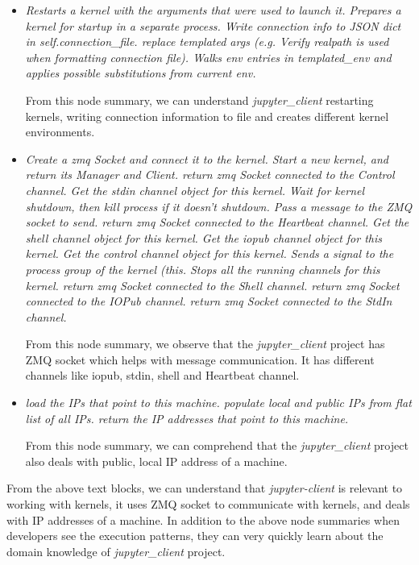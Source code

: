 \begin{itemize}
    \item \emph{ Restarts a kernel with the arguments that were used to launch it. Prepares a kernel for startup in a separate process. Write connection info to JSON dict in self.connection\_file. replace templated args (e.g. Verify realpath is used when formatting connection file). Walks env entries in templated\_env and applies possible substitutions from current env.} 
    
    From this node summary, we can understand \emph{jupyter\_client} restarting kernels, writing connection information to file and creates different kernel environments.
    
    \item \emph{Create a zmq Socket and connect it to the kernel. Start a new kernel, and return its Manager and Client. return zmq Socket connected to the Control channel. Get the stdin channel object for this kernel. Wait for kernel shutdown, then kill process if it doesn't shutdown. Pass a message to the ZMQ socket to send. return zmq Socket connected to the Heartbeat channel. Get the shell channel object for this kernel. Get the iopub channel object for this kernel. Get the control channel object for this kernel. Sends a signal to the process group of the kernel (this. Stops all the running channels for this kernel. return zmq Socket connected to the Shell channel. return zmq Socket connected to the IOPub channel. return zmq Socket connected to the StdIn channel.} 
    
    From this node summary, we observe that the \emph{jupyter\_client} project has ZMQ socket which helps with message communication. It has different channels like iopub, stdin, shell and Heartbeat channel.
    
    \item \emph{load the IPs that point to this machine. populate local and public IPs from flat list of all IPs. return the IP addresses that point to this machine.} 
    
    From this node summary, we can comprehend that the \emph{jupyter\_client} project also deals with public, local IP address of a machine. 

\end{itemize}

From the above text blocks, we can understand that \emph{jupyter-client} is relevant to working with kernels, it uses ZMQ socket to communicate with kernels, and deals with IP addresses of a machine. In addition to the above node summaries when developers see the execution patterns, they can very quickly learn about the domain knowledge of \emph{jupyter\_client} project.

